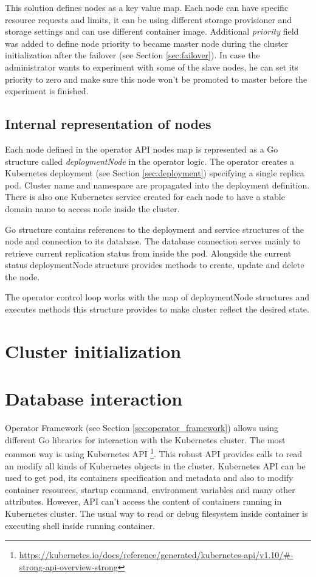 \documentclass[
  digital, %
  twoside, %
  table,   %
  lof,     %
  lot,     %
]{fithesis3}
\begin{document}
This solution defines nodes as a key value map. Each node can have specific resource requests and limits, it can be using different storage provisioner and storage settings and can use different container image. Additional \textit{priority} field was added to define node priority to became master node during the cluster initialization after the failover (see Section \ref{sec:failover}). In case the administrator wants to experiment with some of the slave nodes, he can set its priority to zero and make sure this node won't be promoted to master before the experiment is finished.

\subsection{Internal representation of nodes}
 Each node defined in the operator API nodes map is represented as a Go structure called \textit{deploymentNode} in the operator logic. The operator creates a Kubernetes deployment (see Section \ref{sec:deployment}) specifying a single replica pod. Cluster name and namespace are propagated into the deployment definition. There is also one Kubernetes service created for each node to have a stable domain name to access node inside the cluster.

 Go structure contains references to the deployment and service structures of the node and connection to its database. The database connection serves mainly to retrieve current replication status from inside the pod. Alongside the current status deploymentNode structure provides methods to create, update and delete the node.

 The operator control loop works with the map of deploymentNode structures and executes methods this structure provides to make cluster reflect the desired state.

\section{Cluster initialization}
\section{Database interaction}
Operator Framework (see Section \ref{sec:operator_framework}) allows using different Go libraries for interaction with the Kubernetes cluster. The most common way is using Kubernetes API \footnote{\url{https://kubernetes.io/docs/reference/generated/kubernetes-api/v1.10/\#-strong-api-overview-strong}}. This robust API provides calls to read an modify all kinds of Kubernetes objects in the cluster. Kubernetes API can be used to get pod, its containers specification and metadata and also to modify container resources, startup command, environment variables and many other attributes. However, API can't access the content of containers running in Kubernetes cluster. The usual way to read or debug filesystem inside container is executing shell inside running container.
\end{document}
